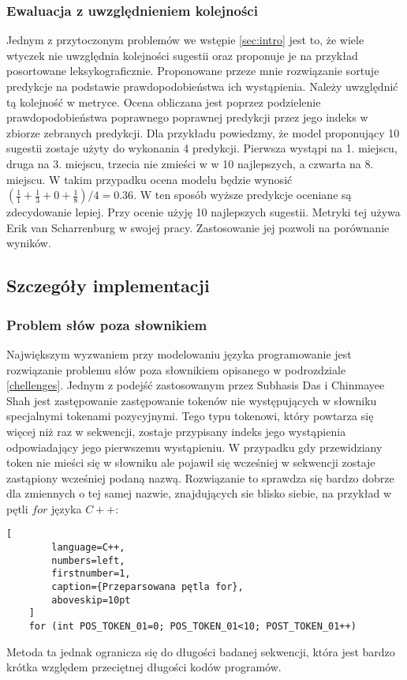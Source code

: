 \subsubsection{Ewaluacja z uwzględnieniem kolejności}
Jednym z przytoczonym problemów we wstępie \ref{sec:intro} jest to, że wiele wtyczek nie uwzględnia kolejności sugestii oraz proponuje je na przykład posortowane leksykograficznie. Proponowane przeze mnie rozwiązanie 
sortuje predykcje na podstawie prawdopodobieństwa ich wystąpienia. Należy uwzględnić tą kolejność w metryce. Ocena obliczana jest poprzez podzielenie prawdopodobieństwa poprawnego poprawnej predykcji przez 
jego indeks w zbiorze zebranych predykcji. Dla przykładu powiedzmy, że model proponujący 10 sugestii zostaje użyty do wykonania 4 predykcji. Pierwsza wystąpi na 1. miejscu, druga na 3. miejscu, trzecia nie zmieści w w 10 najlepszych, 
a czwarta na 8. miejscu. W takim przypadku ocena modelu będzie wynosić \begin{math}(\frac{1}{1}+ \frac{1}{3}+ 0 +\frac{1}{8})/4 = 0.36\end{math}. W ten sposób wyższe predykcje oceniane są zdecydowanie lepiej.
Przy ocenie użyję 10 najlepszych sugestii.  Metryki tej używa Erik van Scharrenburg \cite{erik} w swojej pracy. Zastosowanie jej pozwoli na porównanie wyników. 

\subsection{Szczegóły implementacji}
\subsubsection{Problem słów poza słownikiem}
\label{oov}
Największym wyzwaniem przy modelowaniu języka programowanie jest rozwiązanie problemu słów poza słownikiem opisanego w podrozdziale \ref{chellenges}. 
Jednym z podejść zastosowanym przez Subhasis Das i Chinmayee Shah jest zastępowanie zastępowanie tokenów nie występujących w słowniku 
specjalnymi tokenami pozycyjnymi. Tego typu tokenowi, który powtarza się więcej niż raz w sekwencji, zostaje przypisany indeks jego wystąpienia 
odpowiadający jego pierwszemu wystąpieniu. W przypadku gdy przewidziany token nie mieści się w słowniku ale pojawił się wcześniej w 
sekwencji zostaje zastąpiony wcześniej podaną nazwą. Rozwiązanie to sprawdza się bardzo dobrze dla zmiennych o tej samej nazwie, znajdujących 
sie blisko siebie, na przykład w pętli \begin{math}for\end{math} języka \begin{math}C++\end{math}: 
\begin{addmargin}[10mm]{0mm}
    \begin{lstlisting}[
        language=C++,
        numbers=left,
        firstnumber=1,
        caption={Przeparsowana pętla for},
        aboveskip=10pt
    ]
    for (int POS_TOKEN_01=0; POS_TOKEN_01<10; POST_TOKEN_01++)
    \end{lstlisting}
    \end{addmargin}
Metoda ta jednak ogranicza się do długości badanej sekwencji, która jest bardzo krótka względem przeciętnej długości kodów programów.


